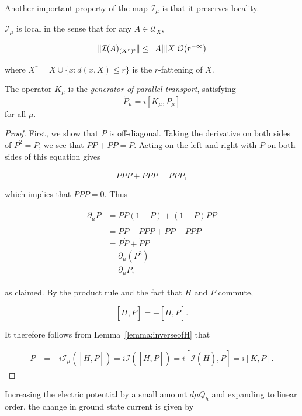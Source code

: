 \documentclass[12pt, letterpaper]{article}
\begin{document}
Another important property of the map $\mathcal{I}_\mu$ is that it preserves locality.

\begin{lemma}
$\mathcal{I}_\mu$ is local in the sense that for any $A \in \mathcal{U}_X$, 

\[\lVert \mathcal{I}(A)_{(X^r)^\mathsf{c}} \rVert \leq \lVert A \rVert |X| \mathcal{O}(r^{-\infty})\]

where $X^r = X \cup \{ x : d(x,X) \leq r\}$ is the $r$-fattening of $X$.
\label{lemma:local}
\end{lemma}

\begin{proposition}
The operator $K_\mu$ is the \emph{generator of parallel transport}, satisfying
\[\dot{P}_\mu = i[K_\mu,P_\mu]\]
for all $\mu$.
\label{prop:generatorparalleltransport}
\end{proposition}
\begin{proof}
First, we show that $\dot{P}$ is off-diagonal. Taking the derivative on both sides of $P^2=P$, we see that $\dot{P} P + P \dot{P} = \dot{P}$. Acting on the left and right with $P$ on both sides of this equation gives 

\[P\dot{P}P + P\dot{P}P = P\dot{P}P,\]

which implies that $P\dot{P}P = 0$. Thus 

\[\begin{aligned}
\overline{\partial_\mu P} &= P\dot{P}(1-P) + (1-P)\dot{P}P\\
&= P\dot{P} - P\dot{P}P + \dot{P}P - P\dot{P}P\\
&= P\dot{P} + \dot{P}P\\
&= \partial_\mu (P^2)\\
&= \partial_\mu P,
\end{aligned}\]

as claimed. By the product rule and the fact that $H$ and $P$ commute, 

\[ [\dot{H}, P] = -[H, \dot{P}]. \]

It therefore follows from Lemma~\ref{lemma:inverseofH} that 

\[\begin{aligned}
\dot{P} &= -i \mathcal{I}_\mu([H, \dot{P}]) = i\mathcal{I}([\dot{H}, P]) = i[\mathcal{I}(\dot{H}), P] = i[K, P].
\end{aligned}\]
\end{proof}

Increasing the electric potential by a small amount $d\mu Q_h$ and expanding to linear order, the change in ground state current is given by
\end{document}
